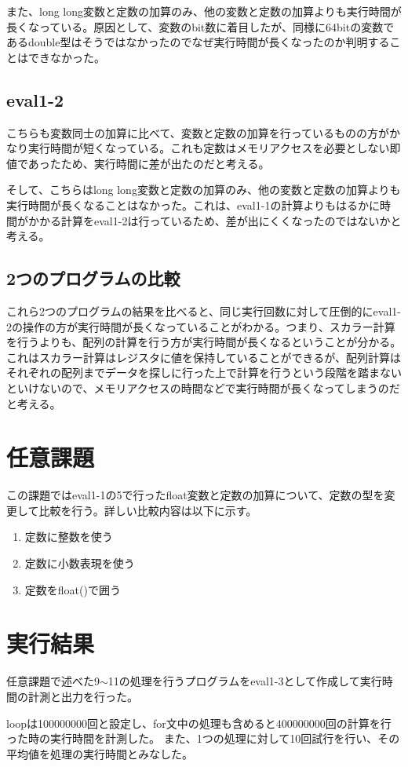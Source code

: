 \documentclass [11pt,a4paper,dvipdfmx]{ujarticle}
\begin{document}
また、long long変数と定数の加算のみ、他の変数と定数の加算よりも実行時間が長くなっている。原因として、変数のbit数に着目したが、同様に64bitの変数であるdouble型はそうではなかったのでなぜ実行時間が長くなったのか判明することはできなかった。
\subsection{eval1-2}
こちらも変数同士の加算に比べて、変数と定数の加算を行っているものの方がかなり実行時間が短くなっている。これも定数はメモリアクセスを必要としない即値であったため、実行時間に差が出たのだと考える。

そして、こちらはlong long変数と定数の加算のみ、他の変数と定数の加算よりも実行時間が長くなることはなかった。これは、eval1-1の計算よりもはるかに時間がかかる計算をeval1-2は行っているため、差が出にくくなったのではないかと考える。
\subsection{2つのプログラムの比較}
これら2つのプログラムの結果を比べると、同じ実行回数に対して圧倒的にeval1-2の操作の方が実行時間が長くなっていることがわかる。つまり、スカラー計算を行うよりも、配列の計算を行う方が実行時間が長くなるということが分かる。
これはスカラー計算はレジスタに値を保持していることができるが、配列計算はそれぞれの配列までデータを探しに行った上で計算を行うという段階を踏まないといけないので、メモリアクセスの時間などで実行時間が長くなってしまうのだと考える。
\clearpage
\section{任意課題}
この課題ではeval1-1の5で行ったfloat変数と定数の加算について、定数の型を変更して比較を行う。詳しい比較内容は以下に示す。
\begin{enumerate}[start = 9]
  \item 定数に整数を使う
  \item 定数に小数表現を使う
  \item 定数をfloat()で囲う
\end{enumerate}
\section{実行結果}
任意課題で述べた9$\sim$11の処理を行うプログラムをeval1-3として作成して実行時間の計測と出力を行った。

loopは100000000回と設定し、for文中の処理も含めると400000000回の計算を行った時の実行時間を計測した。
また、1つの処理に対して10回試行を行い、その平均値を処理の実行時間とみなした。
\end{document}
